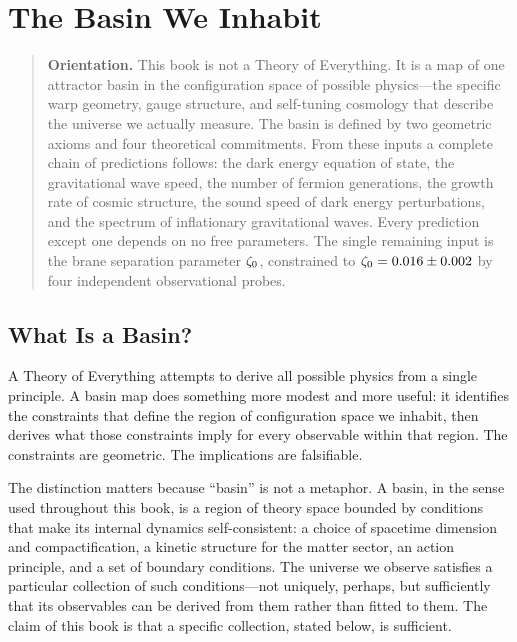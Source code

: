 
\chapter[The Basin We Inhabit]{The Basin We Inhabit}
\label{ch:basin}

\begin{quote}
\textbf{Orientation.}
This book is not a Theory of Everything. It is a map of one attractor
basin in the configuration space of possible physics---the specific
warp geometry, gauge structure, and self-tuning cosmology that describe
the universe we actually measure. The basin is defined by two geometric
axioms and four theoretical commitments. From these inputs a complete
chain of predictions follows: the dark energy equation of state, the
gravitational wave speed, the number of fermion generations, the growth
rate of cosmic structure, the sound speed of dark energy perturbations,
and the spectrum of inflationary gravitational waves. Every prediction
except one depends on no free parameters. The single remaining input
is the brane separation parameter $\zeta_0$, constrained to
$\zeta_0 = 0.016 \pm 0.002$ by four independent observational probes.
\end{quote}

\section{What Is a Basin?}
\label{sec:0-basin}

A Theory of Everything attempts to derive all possible physics from a
single principle. A basin map does something more modest and more
useful: it identifies the constraints that define the region of
configuration space we inhabit, then derives what those constraints
imply for every observable within that region. The constraints are
geometric. The implications are falsifiable.

The distinction matters because ``basin'' is not a metaphor. A basin,
in the sense used throughout this book, is a region of theory space
bounded by conditions that make its internal dynamics self-consistent:
a choice of spacetime dimension and compactification, a kinetic
structure for the matter sector, an action principle, and a set of
boundary conditions. The universe we observe satisfies a particular
collection of such conditions---not uniquely, perhaps, but sufficiently
that its observables can be derived from them rather than fitted to
them. The claim of this book is that a specific collection, stated
below, is sufficient.

